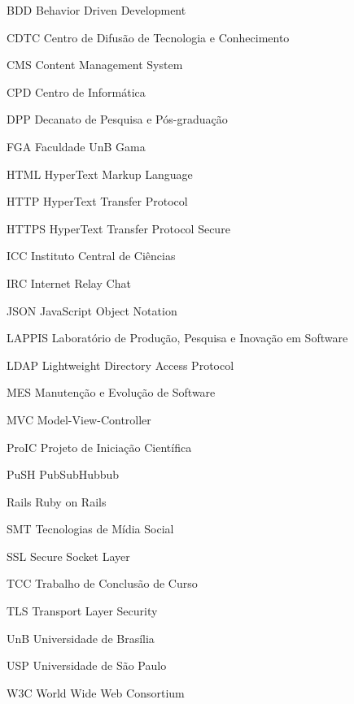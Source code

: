 \begin{siglas}
  \item[BDD] Behavior Driven Development
  \item[CDTC] Centro de Difusão de Tecnologia e Conhecimento
  \item[CMS] Content Management System
  \item[CPD] Centro de Informática
  \item[DPP] Decanato de Pesquisa e Pós-graduação
  \item[FGA] Faculdade UnB Gama
  \item[HTML] HyperText Markup Language
  \item[HTTP] HyperText Transfer Protocol
  \item[HTTPS] HyperText Transfer Protocol Secure
  \item[ICC] Instituto Central de Ciências
  \item[IRC] Internet Relay Chat
  \item[JSON] JavaScript Object Notation
  \item[LAPPIS] Laboratório de Produção, Pesquisa e Inovação em Software
  \item[LDAP] Lightweight Directory Access Protocol
  \item[MES] Manutenção e Evolução de Software
  \item[MVC] Model-View-Controller
  \item[ProIC] Projeto de Iniciação Científica
  \item[PuSH] PubSubHubbub
  \item[Rails] Ruby on Rails
  \item[SMT] Tecnologias de Mídia Social
  \item[SSL] Secure Socket Layer
  \item[TCC] Trabalho de Conclusão de Curso
  \item[TLS] Transport Layer Security
  \item[UnB] Universidade de Brasília
  \item[USP] Universidade de São Paulo
  \item[W3C] World Wide Web Consortium
\end{siglas}
